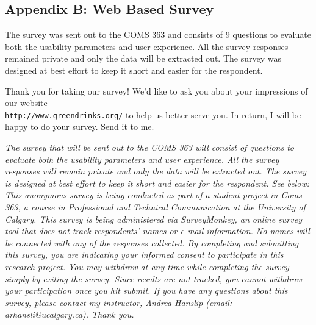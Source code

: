\documentclass[12pt]{article}
\begin{document}
 

\newpage
\subsection*{Appendix B: Web Based Survey}
The survey was sent out to the COMS 363 and consists of 9 questions to evaluate both the usability parameters and user experience. All the survey responses remained private and only the data will be extracted out. The survey was designed at best effort to keep it short and easier for the respondent.

Thank you for taking our survey! We’d like to ask you about your impressions of our website \\\texttt{http://www.greendrinks.org/} to help us better serve you. In return, I will be happy to do your survey. Send it to me. 

\textit{The survey that will be sent out to the COMS 363 will consist of questions to evaluate both the usability parameters and user experience. All the survey responses will remain private and only the data will be extracted out. The survey is designed at best effort to keep it short and easier for the respondent. See below:
This anonymous survey is being conducted as part of a student project in Coms 363, a course in Professional and Technical Communication at the University of Calgary. This survey is being administered via SurveyMonkey, an online survey tool that does not track respondents’ names or e-mail information. No names will be connected with any of the responses collected. By completing and submitting this survey, you are indicating your informed consent to participate in this research project. You may withdraw at any time while completing the survey simply by exiting the survey. Since results are not tracked, you cannot withdraw your participation once you hit submit. If you have any questions about this survey, please contact my instructor, Andrea Hanslip (email: arhansli@ucalgary.ca). Thank you.}
\end{document}

